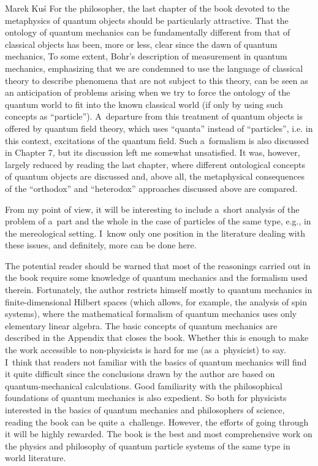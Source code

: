 \begin{newrevengenv}{Marek Kuś}
For the philosopher, the last chapter of the book devoted to the metaphysics of quantum objects should be particularly attractive. That the ontology of quantum mechanics can be fundamentally different from that of classical objects has been, more or less, clear since the dawn of quantum mechanics, To some extent, Bohr's description of measurement in quantum mechanics, emphasizing that we are condemned to use the language of classical theory to describe phenomena that are not subject to this theory, can be seen as an anticipation of problems arising when we try to force the ontology of the quantum world to fit into the known classical world (if only by using such concepts as ``particle''). A~departure from this treatment of quantum objects is offered by quantum field theory, which uses ``quanta'' instead of ``particles'', i.e. in this context, excitations of the quantum field. Such a~formalism is also discussed in Chapter 7, but its discussion left me somewhat unsatisfied. It was, however, largely reduced by reading the last chapter, where different ontological concepts of quantum objects are discussed and, above all, the metaphysical consequences of the ``orthodox'' and ``heterodox'' approaches discussed above are compared.

From my point of view, it will be interesting to include a~short analysis of the problem of a~part and the whole in the case of particles of the same type, e.g., in the mereological setting. I~know only one position in the literature
\parencite[][]{caulton_is_2015} %
 dealing with these issues, and definitely, more can be done here.

The potential reader should be warned that most of the reasonings carried out in the book require some knowledge of quantum mechanics and the formalism used therein. Fortunately, the author restricts himself mostly to quantum mechanics in finite-dimensional Hilbert spaces (which allows, for example, the analysis of spin systems), where the mathematical formalism of quantum mechanics uses only elementary linear algebra. The basic concepts of quantum mechanics are described in the Appendix that closes the book. Whether this is enough to make the work accessible to non-physicists is hard for me (as a~physicist) to say. I~think that readers not familiar with the basics of quantum mechanics will find it quite difficult since the conclusions drawn by the author are based on quantum-mechanical calculations. Good familiarity with the philosophical foundations of quantum mechanics is also expedient. So both for physicists interested in the basics of quantum mechanics and philosophers of science, reading the book can be quite a~challenge. However, the efforts of going through it will be highly rewarded. The book is the best and most comprehensive work on the physics and philosophy of quantum particle systems of the same type in world literature.




\end{newrevengenv}

